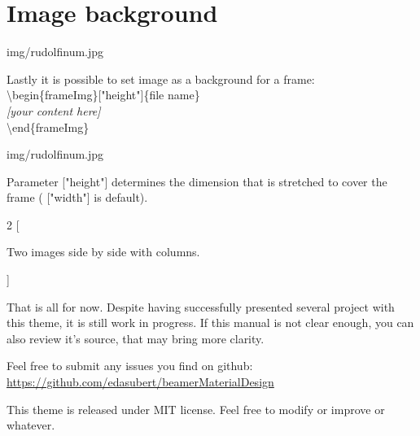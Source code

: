 \documentclass[9pt, aspectratio=169]{beamer}
\begin{document}
\section{Image background}
\begin{frameImg}{img/rudolfinum.jpg}
\vspace*{60mm}
\begin{cardTiny}
Lastly it is possible to set image as a background for a frame:\\[2mm]
{\color{primary} \textbackslash begin\{frameImg\}["height"]\{file name\}\\[2mm]}
\null\qquad \textit{[your content here]}\\[2mm]
{\color{primary} \textbackslash end\{frameImg\}}
\end{cardTiny}
\end{frameImg}

\begin{frameImg}[height]{img/rudolfinum.jpg}
\vspace*{60mm}
\begin{cardTiny}
Parameter {\color{primary} ["height"]} determines the dimension that is stretched to cover the frame ({\color{primary} ["width"]} is default).
\end{cardTiny}
\end{frameImg}

\begin{frame}
\begin{multicols}{2}
[
\begin{cardTiny}
Two images side by side with columns.
\end{cardTiny}
]
\centering
{}

\end{multicols}
\end{frame}

\begin{frame}
\begin{card}
That is all for now. Despite having successfully presented several project with this theme, it is still work in progress. If this manual is not clear enough, you can also review it's source, that may bring more clarity.
\end{card}
\begin{card}
Feel free to submit any issues you find on github: \\
{\footnotesize \url{https://github.com/edasubert/beamerMaterialDesign}}
\end{card}
\begin{card}
This theme is released under MIT license. Feel free to modify or improve or whatever. 
\end{card}
\end{frame}
\end{document}
